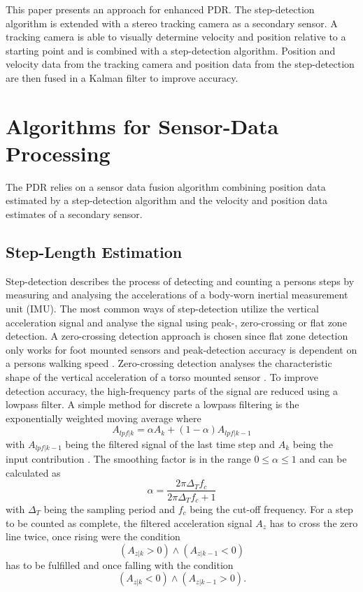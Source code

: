 \documentclass[engproc,conferenceproceedings,submit,pdftex,moreauthors]{Definitions/mdpi}
\begin{document}
This paper presents an approach for enhanced PDR. The step-detection algorithm is extended with a stereo tracking camera as a secondary sensor. A tracking camera is able to visually determine velocity and position relative to a starting point and is combined with a step-detection algorithm. Position and velocity data from the tracking camera and position data from the step-detection are then fused in a Kalman filter to improve accuracy.
\section{Algorithms for Sensor-Data Processing}

The PDR relies on a sensor data fusion algorithm combining position data estimated by a step-detection algorithm and the velocity and position data estimates of a secondary sensor.\\

\subsection{Step-Length Estimation}\label{sub:stepD}
Step-detection describes the process of detecting and counting a persons steps by measuring and analysing the accelerations of a body-worn inertial measurement unit (IMU). The most common ways of step-detection utilize  the vertical acceleration signal and analyse the signal using peak-, zero-crossing or flat zone detection. A zero-crossing detection approach is chosen since flat zone detection only works for foot mounted sensors and peak-detection accuracy is dependent on a persons walking speed \cite{shin2007}. Zero-crossing detection analyses the characteristic shape of the vertical acceleration of a torso mounted sensor \cite{zhao2022}. To improve detection accuracy, the high-frequency parts of the signal are reduced using a lowpass filter. A simple method for discrete a lowpass filtering is the exponentially weighted moving average where 
\begin{equation}
	A_{lpf |k} = \alpha A_k + (1-\alpha) A_{lpf|k-1}
\end{equation} with $A_{lpf|k-1}$ being the filtered signal of the last time step and $A_k$ being the input contribution \cite{nistsematech2012}. The smoothing factor is in the range $0 \leq \alpha \leq 1$ and can be calculated as 
\begin{equation}
	\alpha = \frac{2\pi \Delta_T f_c}{2\pi \Delta_T f_c +1}
\end{equation} with $\Delta_T$ being the sampling period and $f_c$ being the cut-off frequency.  For a step to be counted as complete, the filtered acceleration signal $A_z$ has to cross the zero line twice, once rising were the condition
\begin{equation}
	(A_{z|k} > 0) \wedge (A_{z|k-1} < 0)  %
\end{equation} 
has to be fulfilled and once falling with the condition
\begin{equation}
	(A_{z|k} < 0) \wedge (A_{z|k-1} > 0).  %
\end{equation} 
\\
\end{document}
